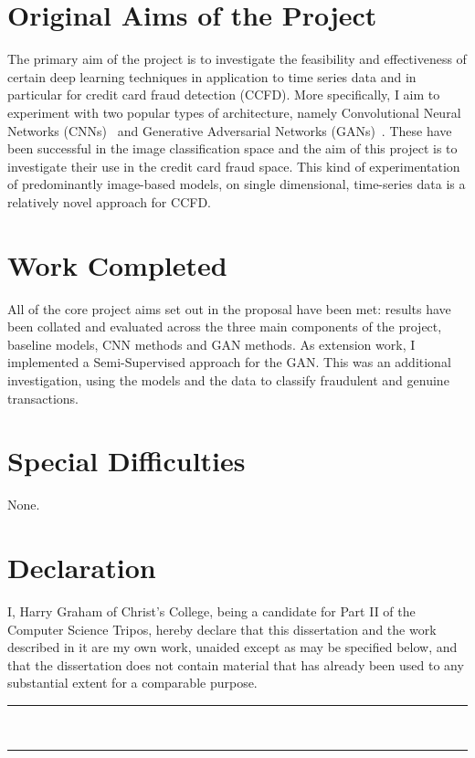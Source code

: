 \documentclass[12pt,a4paper,twoside]{report}
\begin{document}
\section*{Original Aims of the Project}
The primary aim of the project is to investigate the feasibility and effectiveness of certain deep learning techniques in application to time series data and in particular for credit card fraud detection (CCFD). More specifically, I aim to experiment with two popular types of architecture, namely Convolutional Neural Networks (CNNs)~\cite{DBLP:journals/corr/SimonyanZ14a} and Generative Adversarial Networks (GANs)~\cite{2014arXiv1406.2661G}. These have been successful in the image classification space and the aim of this project is to investigate their use in the credit card fraud space. This kind of experimentation of predominantly image-based models, on single dimensional, time-series data is a relatively novel approach for CCFD.

\section*{Work Completed}
All of the core project aims set out in the proposal have been met: results have been collated and evaluated across the three main components of the project, baseline models, CNN methods and GAN methods. 
As extension work, I implemented a Semi-Supervised approach for the GAN. This was an additional investigation, using the models and the data to classify fraudulent and genuine transactions.

\section*{Special Difficulties}
None.


\newpage

\section*{Declaration}

I, Harry Graham of Christ's College, being a candidate for Part II of the Computer Science Tripos, hereby declare that this dissertation and the work described in it are my own work, unaided except as may be specified below, and that the dissertation does not contain material that has already been used to any substantial extent for a comparable purpose.

\vspace{1cm}
\begin{multicols}{2}

\rule{5cm}{0.15mm} \\

\columnbreak

\rule{5cm}{0.15mm} \\

\end{multicols}
\end{document}
